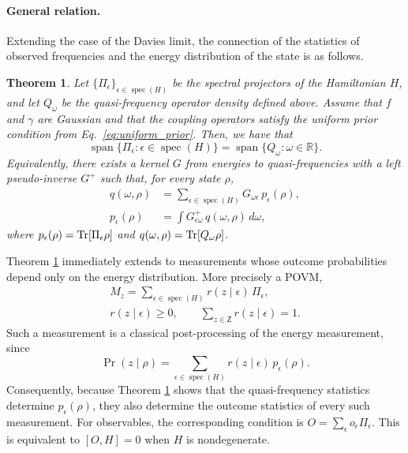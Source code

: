\documentclass[showpacs,amsmath,amssymb,twocolumn,prx,superscriptaddress,10pt,aps,nofootinbib]{revtex4-2}
\newcommand{\vspan}{\operatorname{span}}
\newtheorem{theorem}{Theorem}
\begin{document}
\paragraph{General relation.} Extending the case of the Davies limit, the connection of the statistics of observed frequencies and the energy distribution of the state is as follows.

\begin{theorem}
\label{thm:energy_vs_frequencies}
Let $\{\Pi_{\epsilon}\}_{\epsilon\in\operatorname{spec}(H)}$ be the spectral projectors of the Hamiltonian $H$, and let $Q_{\omega}$ be the quasi-frequency operator density defined above. Assume that $f$ and $\gamma$ are Gaussian and that the coupling operators satisfy the uniform prior condition from Eq.~\eqref{eq:uniform_prior}. Then, we have that
\begin{equation}
    \vspan\{\Pi_{\epsilon}:\epsilon\in\operatorname{spec}(H)\}
    =
    \vspan\{Q_{\omega}:\omega\in\mathbb R\}.
\end{equation}
Equivalently, there exists a kernel $G$ from energies to quasi-frequencies with a left pseudo-inverse $G^+$ such that, for every state $\rho$,
\begin{align}
q(\omega,\rho)&=\sum_{\epsilon\in\operatorname{spec}(H)} G_{\omega\epsilon}\,p_{\epsilon}(\rho), \\
    p_{\epsilon}(\rho)&=\int G^+_{\epsilon\omega}\,q(\omega,\rho)\,d\omega,
\end{align}
where $p_{\epsilon}(\rho)=\Tr[\Pi_{\epsilon}\rho]$ and $q(\omega,\rho)=\Tr[Q_{\omega}\rho]$.
\end{theorem}

Theorem \ref{thm:energy_vs_frequencies} immediately extends to measurements whose outcome probabilities depend only on the energy distribution. More precisely a POVM,
\begin{equation}
\begin{aligned}
M_z
=
\sum_{\epsilon\in\operatorname{spec}(H)}
r(z\mid\epsilon)\,\Pi_\epsilon,
\\
r(z\mid\epsilon)\geq 0,
\qquad
\sum_{z\in\mathsf Z}r(z\mid\epsilon)=1.
\end{aligned}
\end{equation}
Such a measurement is a classical post-processing of the energy measurement, since
\begin{equation}
    \Pr(z\mid\rho)
    =
    \sum_{\epsilon\in\operatorname{spec}(H)}
    r(z\mid\epsilon)\,p_\epsilon(\rho).
\end{equation}
Consequently, because Theorem \ref{thm:energy_vs_frequencies} shows that the quasi-frequency statistics determine $p_\epsilon(\rho)$, they also determine the outcome statistics of every such measurement. For observables, the corresponding condition is $O=\sum_\epsilon o_\epsilon\Pi_\epsilon$. This is equivalent to $[O,H]=0$ when $H$ is nondegenerate.
\end{document}
